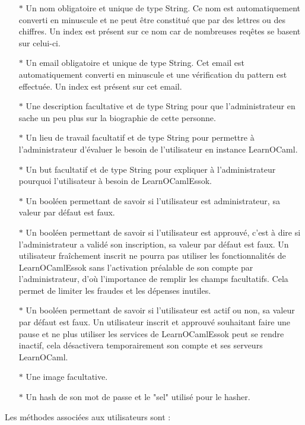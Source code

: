 \documentclass{article}
\begin{document}
\begin{itemize}
	\item[$\ast$]Un nom obligatoire et unique de type String. Ce nom est automatiquement converti en minuscule et ne peut être constitué que par des lettres ou des chiffres. Un index est présent sur ce nom car de nombreuses reqêtes se basent sur celui-ci.
	\item[$\ast$]Un email obligatoire et unique de type String. Cet email est automatiquement converti en minuscule et une vérification du pattern est effectuée. Un index est présent sur cet email.
	\item[$\ast$]Une description facultative et de type String pour que l'administrateur en sache un peu plus sur la biographie de cette personne.
	\item[$\ast$]Un lieu de travail facultatif et de type String pour permettre à l'administrateur d'évaluer le besoin de l'utilisateur en instance LearnOCaml.
	\item[$\ast$]Un but facultatif et de type String pour expliquer à l'administrateur pourquoi l'utilisateur à besoin de LearnOCamlEssok.
	\item[$\ast$]Un booléen permettant de savoir si l'utilisateur est administrateur, sa valeur par défaut est faux.
	\item[$\ast$]Un booléen permettant de savoir si l'utilisateur est approuvé, c'est à dire si l'administrateur a validé son inscription, sa valeur par défaut est faux. Un utilisateur fraîchement inscrit ne pourra pas utiliser les fonctionnalités de LearnOCamlEssok sans l'activation préalable de son compte par l'administrateur, d'où l'importance de remplir les champs facultatifs. Cela permet de limiter les fraudes et les dépenses inutiles.
	\item[$\ast$]Un booléen permettant de savoir si l'utilisateur est actif ou non, sa valeur par défaut est faux. Un utilisateur inscrit et approuvé souhaitant faire une pause et ne plus utiliser les services de LearnOCamlEssok peut se rendre inactif, cela désactivera temporairement son compte et ses serveurs LearnOCaml.
	\item[$\ast$]Une image facultative.
	\item[$\ast$]Un hash de son mot de passe et le "sel" utilisé pour le hasher.
\end{itemize}
Les méthodes associées aux utilisateurs sont :
\end{document}
